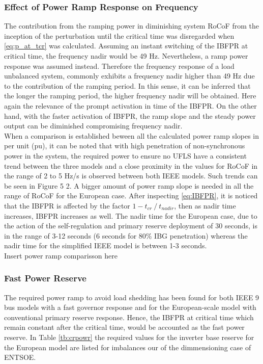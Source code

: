 \subsubsection{Effect of Power Ramp Response on Frequency}

The contribution from the ramping power in diminishing system RoCoF from the inception of the perturbation until the critical time was disregarded when \ref{eq:p_at_tcr} was calculated. Assuming an instant switching of the IBFPR at critical time, the frequency nadir would be 49 Hz. Nevertheless, a ramp power response was assumed instead. Therefore the frequency response of a load unbalanced system, commonly exhibits a frequency nadir higher than 49 Hz due to the contribution of the ramping period. In this sense, it can be inferred that the longer the ramping period, the higher frequency nadir will be obtained. Here again the relevance of the prompt activation in time of the IBFPR. On the other hand, with the faster activation of IBFPR, the ramp slope and the steady power output can be diminished compromising frequency nadir.\\ 

When a comparison is established beween all the calculated power ramp slopes in per unit (pu), it can be noted that with high penetration of non-synchronous power in the system, the required power to ensure no UFLS have a consistent trend between the three models and a close proximity in the values for RoCoF in the range of 2 to 5 Hz/s is observed between both IEEE models. Such trends can be seen in Figure 5 2. A bigger amount of power ramp slope is needed in all the range of RoCoF for the European case. After inspecting \ref{eq:IBFPR}, it is noticed that the IBFPR is affected by the factor $ 1-t_{cr}⁄t_{nadir} $, then as nadir time increases, IBFPR increases as well. The nadir time for the European case, due to the action of the self-regulation and primary reserve deployment of 30 seconds, is in the range of 3-12 seconds (6 seconds for 80\% IBG penetration) whereas the nadir time for the simplified IEEE model is between 1-3 seconds.\\

Insert power ramp comparisson here

\subsubsection{Fast Power Reserve}


The required power ramp  to avoid load shedding has been found for both IEEE 9 bus models with a fast governor response and for the European-scale model  with conventional primary reserve response. Hence, the IBFPR at critical time which remain constant after the critical time, would be accounted as the fast power reserve. In Table \ref{tb:crpowr} the required values for the inverter base reserve for the European model are listed for imbalances our of the dimmensioning case of ENTSOE.

